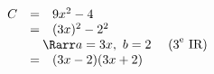 \begin{methode}
\begin{correction}
\[\begin{array}{lll}
\begin{array}{rcl}
					C & =                                                                             & 9x^2 - 4         \\
					  & =                                                                             & (3x)^2 - 2^2     \\
					  & \multicolumn{2}{l}{\quad\Rarr a=3x,\ b=2 \quad\text{ (3}^\text{e}\text{ IR)}}                    \\
					  & =                                                                             & (3x - 2)(3x + 2) \\
				\end{array}%
			\end{array}%
		\]
	\end{correction}
\end{methode}

